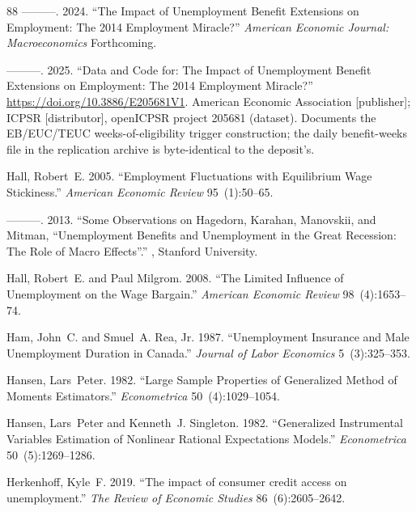 \documentclass[12pt]{article}
\newcommand{\1}{\mathbf{1}}
\begin{document}
\begin{thebibliography}{88}
---{}---{}---. 2024.
\newblock \enquote{The Impact of Unemployment Benefit Extensions on Employment: The 2014 Employment Miracle?}
\newblock \emph{American Economic Journal: Macroeconomics} Forthcoming.

---{}---{}---. 2025.
\newblock \enquote{Data and Code for: The Impact of Unemployment Benefit Extensions on Employment: The 2014 Employment Miracle?}
\newblock \urlprefix\url{https://doi.org/10.3886/E205681V1}.
\newblock American Economic Association [publisher]; {ICPSR} [distributor], open{ICPSR} project 205681 (dataset). Documents the {EB}/{EUC}/{TEUC} weeks-of-eligibility trigger construction; the daily benefit-weeks file in the replication archive is byte-identical to the deposit's.

Hall, Robert~E. 2005.
\newblock \enquote{Employment Fluctuations with Equilibrium Wage Stickiness.}
\newblock \emph{American Economic Review} 95~(1):50--65.

---{}---{}---. 2013.
\newblock \enquote{Some Observations on Hagedorn, Karahan, Manovskii, and Mitman, ``Unemployment Benefits and Unemployment in the Great Recession: The Role of Macro Effects''.}
, Stanford University.

Hall, Robert~E. and Paul Milgrom. 2008.
\newblock \enquote{The Limited Influence of Unemployment on the Wage Bargain.}
\newblock \emph{American Economic Review} 98~(4):1653--74.

Ham, John~C. and Smuel~A. Rea, Jr. 1987.
\newblock \enquote{Unemployment Insurance and Male Unemployment Duration in Canada.}
\newblock \emph{Journal of Labor Economics} 5~(3):325--353.

Hansen, Lars~Peter. 1982.
\newblock \enquote{Large Sample Properties of Generalized Method of Moments Estimators.}
\newblock \emph{Econometrica} 50~(4):1029--1054.

Hansen, Lars~Peter and Kenneth~J. Singleton. 1982.
\newblock \enquote{Generalized Instrumental Variables Estimation of Nonlinear Rational Expectations Models.}
\newblock \emph{Econometrica} 50~(5):1269--1286.

Herkenhoff, Kyle~F. 2019.
\newblock \enquote{The impact of consumer credit access on unemployment.}
\newblock \emph{The Review of Economic Studies} 86~(6):2605--2642.


\end{thebibliography}
\end{document}
